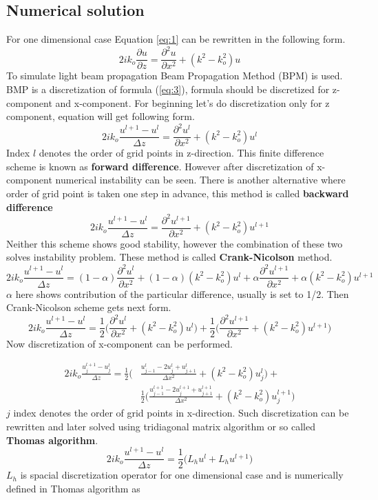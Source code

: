 \documentclass[a4paper]{article}
\begin{document}
	\subsection{Numerical solution}
	For one dimensional case Equation \ref{eq:1} can be rewritten in the following form.
	\begin{equation}\label{eq:3}
	2ik_o\frac{\partial u}{\partial z}=\frac{\partial^2 u}{\partial x^2}+(k^2-k_o^2)u
	\end{equation}
	To simulate light beam propagation Beam Propagation Method (BPM) is used. BMP is a discretization of formula (\ref{eq:3}), formula should be discretized for z-component and x-component. For beginning let's do discretization only for z component, equation will get following form.
	\[2ik_o\frac{u^{l+1}-u^l}{\Delta z}=\frac{\partial^2 u^l}{\partial x^2}+(k^2-k_o^2)u^l\]
	Index $l$ denotes the order of grid points in z-direction. This finite difference scheme is known as {\bf forward difference}. However after discretization of x-component numerical instability can be seen. There is another alternative where order of grid point is taken one step in advance, this method is called {\bf backward difference}
	\[2ik_o\frac{u^{l+1}-u^l}{\Delta z}=\frac{\partial^2 u^{l+1}}{\partial x^2}+(k^2-k_o^2)u^{l+1}\]
	Neither this scheme shows good stability, however the combination of these two solves instability problem. These method is called {\bf Crank-Nicolson} method.
	\[2ik_o\frac{u^{l+1}-u^l}{\Delta z}=(1-\alpha)\frac{\partial^2 u^l}{\partial x^2}+(1-\alpha)(k^2-k_o^2)u^l+\alpha \frac{\partial^2 u^{l+1}}{\partial x^2}+\alpha(k^2-k_o^2)u^{l+1}\]
	$\alpha$ here shows contribution of the particular difference, usually is set to 1/2. Then Crank-Nicolson scheme gets next form.
	\[2ik_o\frac{u^{l+1}-u^l}{\Delta z}=\frac{1}{2}\bigg(\frac{\partial^2 u^l}{\partial x^2}+(k^2-k_o^2)u^l\bigg)+\frac{1}{2}\bigg(\frac{\partial^2 u^{l+1}}{\partial x^2}+(k^2-k_o^2)u^{l+1}\bigg)\]
	Now discretization of x-component can be performed.

	\begin{equation*}
	\begin{split}
	2ik_o\frac{u_j^{l+1}-u_j^l}{\Delta z}=\frac{1}{2}\bigg(&\frac{u_{j-1}^l-2u_j^l+u_{j+1}^l}{\Delta x^2}+(k^2-k_o^2)u_j^l\bigg)+\\
	& \frac{1}{2}\bigg(\frac{u_{j-1}^{l+1}-2u_j^{l+1}+u_{j+1}^{l+1}}{\Delta x^2}+(k^2-k_o^2)u_j^{l+1}\bigg)
	\end{split}
	\end{equation*}
	$j$ index denotes the order of grid points in x-direction. Such discretization can be rewritten and later solved using tridiagonal matrix algorithm or so called {\bf Thomas algorithm}. 
	\[2ik_o\frac{u^{l+1}-u^l}{\Delta z}=\frac{1}{2}\bigg(L_hu^{l}+L_hu^{l+1}\bigg)\]
	$L_h$ is spacial discretization operator for one dimensional case and is numerically defined in Thomas algorithm as 
\end{document}
